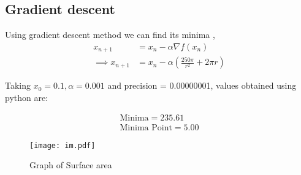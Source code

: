 \documentclass[journal,10pt,twocolumn]{article}
\providecommand{\brak}[1]{\ensuremath{\left(#1\right)}}
\begin{document}
\subsection*{\normalsize Gradient descent}
Using gradient descent method we can find its minima ,
    \begin{align}
        x_{n+1} &= x_n - \alpha \nabla f(x_n) \\
        \implies x_{n+1} &= x_n - \alpha \brak{\frac{250 \pi}{r^2} + 2 \pi r}
    \end{align}
   
Taking $x_0=0.1,\alpha=0.001$ and precision = 0.00000001, values obtained using python are:
    
    \begin{align}
        \boxed{\text{Minima} = 235.61}\\
        \boxed{\text{Minima Point} = 5.00}
    \end{align}
\begin{figure}[t]
 \centering
 \texttt{[image: im.pdf]}
 \caption{Graph of Surface area}
 \label{fig:graph_fx}
\end{figure}
\end{document}
